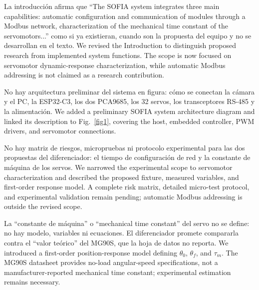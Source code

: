 \documentclass{LabDSTresponse}
\begin{document}
	
	{La introducción afirma que “The SOFIA system integrates three main capabilities: automatic configuration and communication of modules through a Modbus network,
		characterization of the mechanical time constant of the servomotors...” como si ya existieran, cuando son la propuesta del equipo y no se desarrollan en el texto.}
	{We revised the Introduction to distinguish proposed research from implemented system functions. The scope is now focused on servomotor dynamic-response characterization, while automatic Modbus addressing is not claimed as a research contribution.}
	
	
	{No hay arquitectura preliminar del sistema en figura: cómo se conectan la cámara y el PC, la ESP32-C3, los dos PCA9685, los 32 servos, los transceptores RS-485 y la alimentación.}
	{We added a preliminary SOFIA system architecture diagram and linked its description to Fig.~\ref{fig1}, covering the host, embedded controller, PWM drivers, and servomotor connections.}
	
	{No hay matriz de riesgos, micropruebas ni protocolo experimental para las dos propuestas del diferenciador: el tiempo de configuración de red y la constante de máquina de los servos.}
	{We narrowed the experimental scope to
		servomotor characterization and
		described the proposed fixture,
		measured variables, and first-order
		response model. A complete risk matrix,
		detailed micro-test protocol, and
		experimental validation remain pending;
		automatic Modbus addressing is outside the revised scope.}
	
	{La “constante de máquina” o “mechanical time constant” del servo no se define: no hay modelo, variables ni ecuaciones. El diferenciador promete compararla contra el “valor teórico” del MG90S, que la hoja de datos no reporta.}
	{We introduced a first-order position-response model defining $\theta_0$, $\theta_f$, and $\tau_m$. The MG90S datasheet provides no-load angular-speed specifications, not a manufacturer-reported mechanical time constant; experimental estimation remains necessary.}
	
\end{document}
